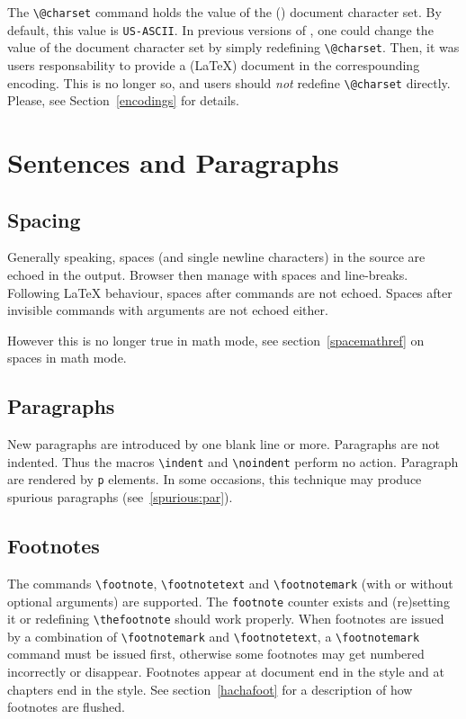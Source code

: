 The \verb+\@charset+ command holds the value of the (\html) document character
set. By default, this value is \texttt{US-ASCII}.
In previous versions of \hevea{}, one could change the
value of the document character set by simply redefining
\verb+\@charset+. Then, it was users responsability to provide a
(\LaTeX) document in the correspounding encoding.
This is no longer so, and users should \emph{not} redefine
\verb+\@charset+ directly. Please, see Section~\ref{encodings} for details.


\section{Sentences and Paragraphs}

\subsection{Spacing}
Generally speaking, spaces (and single newline characters) in the
source are echoed in the output.  Browser then manage with spaces and
line-breaks.  Following \LaTeX{} behaviour, spaces after commands are
not echoed.  Spaces after invisible commands with arguments are not
echoed either.

However this is no longer true in math mode, see
section~\ref{spacemathref} on spaces in math mode.

\subsection{Paragraphs}
New paragraphs are introduced by one blank line or more.
Paragraphs are not indented. Thus the macros \verb+\indent+ and
\verb+\noindent+ perform no action.
Paragraph are rendered by \verb+p+ elements.
In some occasions, this technique may produce spurious paragraphs
(see~\ref{spurious:par}).

\subsection{Footnotes\label{sec:footnotes}}
The commands \verb+\footnote+,
\verb+\footnotetext+ and \verb+\footnotemark+ (with or without
optional arguments) are supported.
The \verb+footnote+ counter exists and (re)setting it or redefining
\verb+\thefootnote+ should work properly.
When footnotes are issued by a combination of \verb+\footnotemark+ and
\verb+\footnotetext+, a \verb+\footnotemark+
command must be issued
first, otherwise some footnotes may get numbered incorrectly or disappear.
Footnotes appear at document end in the  style and
at chapters end in the  style.
See section~\ref{hachafoot} for a description of how footnotes are flushed.


